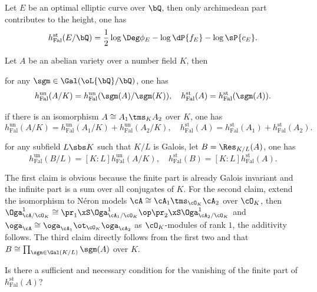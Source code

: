 \documentclass[a4paper, twoside]{article}
\begin{document}
\begin{thm}
	Let $E$ be an optimal elliptic curve over $\bQ$, then only archimedean part contributes to the height, one has
	\[
		h_{\mathrm{Fal}}^{\mathrm{st}}(E/\bQ)=\frac{1}{2}\log\Deg\phi_{E}-\log\dP{f_{E}}-\log\sP{c_{E}}.
	\]
\end{thm}




\begin{thm}
	Let $A$ be an abelian variety over a number field $K$, then
	\begin{enr}[label = (\arabic*)]
		\item for any $\sgm\in \Gal(\oL{\bQ}/\bQ)$, one has
		\[
			h_{\mathrm{Fal}}^{\mathrm{un}}(A/K)=h_{\mathrm{Fal}}^{\mathrm{un}}(\sgm(A)/\sgm(K)),\quad h_{\mathrm{Fal}}^{\mathrm{st}}(A)=h_{\mathrm{Fal}}^{\mathrm{st}}(\sgm(A)).
		\]
		\item if there is an isomorphism $A\cong A_{1}\tms_{K} A_{2}$ over $K$, one has
		\[
			h_{\mathrm{Fal}}^{\mathrm{un}}(A/K)=h_{\mathrm{Fal}}^{\mathrm{un}}(A_{1}/K)+h_{\mathrm{Fal}}^{\mathrm{un}}(A_{2}/K),\quad h_{\mathrm{Fal}}^{\mathrm{st}}(A)=h_{\mathrm{Fal}}^{\mathrm{st}}(A_{1})+h_{\mathrm{Fal}}^{\mathrm{st}}(A_{2}).
		\]
		\item for any subfield $L\sbs K$ such that $K/L$ is Galois, let $B=\Res_{K/L}(A)$, one has
		\[
			h_{\mathrm{Fal}}^{\mathrm{un}}(B/L)=[K:L]h_{\mathrm{Fal}}^{\mathrm{un}}(A/K),\quad h_{\mathrm{Fal}}^{\mathrm{st}}(B)=[K:L]h_{\mathrm{Fal}}^{\mathrm{st}}(A).
		\]
	\end{enr}
\end{thm}

\begin{prf}
	The first claim is obvious because the finite part is already Galois invariant and the infinite part is a sum over all conjugates of $K$. For the second claim, extend the isomorphism to N{\'e}ron models $\cA\cong\cA_{1}\tms_{\cO_{K}}\cA_{2}$ over $\cO_{K}$, then $\Oga_{\cA/\cO_{K}}^{1}\cong\pr_{1}\xS \Oga_{\cA_{1}/\cO_{K}}^{1}\op\pr_{2}\xS \Oga_{\cA_{2}/\cO_{K}}^{1}$ and $\oga_{\cA}\cong\oga_{\cA_{1}}\ot_{\cO_{K}}\oga_{\cA_{2}}$ as $\cO_{K}$-modules of rank $1$, the additivity follows. The third claim directly follows from the first two and that $B\cong\prod_{\sgm\in\Gal(K/L)}\sgm(A)$ over $K$.
\end{prf}


\begin{qst}
	Is there a sufficient and necessary condition for the vanishing of the finite part of $h_{\mathrm{Fal}}^{\mathrm{st}}(A)$?
\end{qst}
\end{document}

